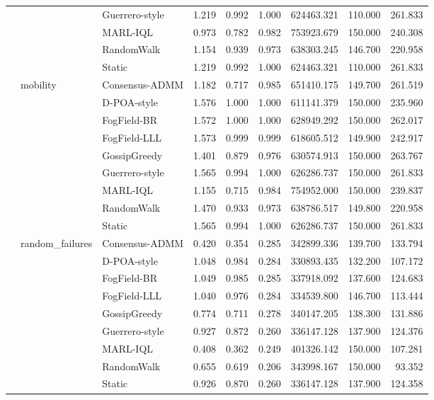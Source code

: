 \begin{table}
\begin{tabular}{lllrrrrrr}
 &  & Guerrero-style & 1.219 & 0.992 & 1.000 & 624463.321 & 110.000 & 261.833 \\
 &  & MARL-IQL & 0.973 & 0.782 & 0.982 & 753923.679 & 150.000 & 240.308 \\
 &  & RandomWalk & 1.154 & 0.939 & 0.973 & 638303.245 & 146.700 & 220.958 \\
 &  & Static & 1.219 & 0.992 & 1.000 & 624463.321 & 110.000 & 261.833 \\
\cline{2-9}
 & \multirow[t]{9}{*}{mobility} & Consensus-ADMM & 1.182 & 0.717 & 0.985 & 651410.175 & 149.700 & 261.519 \\
 &  & D-POA-style & 1.576 & 1.000 & 1.000 & 611141.379 & 150.000 & 235.960 \\
 &  & FogField-BR & 1.572 & 1.000 & 1.000 & 628949.292 & 150.000 & 262.017 \\
 &  & FogField-LLL & 1.573 & 0.999 & 0.999 & 618605.512 & 149.900 & 242.917 \\
 &  & GossipGreedy & 1.401 & 0.879 & 0.976 & 630574.913 & 150.000 & 263.767 \\
 &  & Guerrero-style & 1.565 & 0.994 & 1.000 & 626286.737 & 150.000 & 261.833 \\
 &  & MARL-IQL & 1.155 & 0.715 & 0.984 & 754952.000 & 150.000 & 239.837 \\
 &  & RandomWalk & 1.470 & 0.933 & 0.973 & 638786.517 & 149.800 & 220.958 \\
 &  & Static & 1.565 & 0.994 & 1.000 & 626286.737 & 150.000 & 261.833 \\
\cline{2-9}
 & \multirow[t]{9}{*}{random\_failures} & Consensus-ADMM & 0.420 & 0.354 & 0.285 & 342899.336 & 139.700 & 133.794 \\
 &  & D-POA-style & 1.048 & 0.984 & 0.284 & 330893.435 & 132.200 & 107.172 \\
 &  & FogField-BR & 1.049 & 0.985 & 0.285 & 337918.092 & 137.600 & 124.683 \\
 &  & FogField-LLL & 1.040 & 0.976 & 0.284 & 334539.800 & 146.700 & 113.444 \\
 &  & GossipGreedy & 0.774 & 0.711 & 0.278 & 340147.205 & 138.300 & 131.886 \\
 &  & Guerrero-style & 0.927 & 0.872 & 0.260 & 336147.128 & 137.900 & 124.376 \\
 &  & MARL-IQL & 0.408 & 0.362 & 0.249 & 401326.142 & 150.000 & 107.281 \\
 &  & RandomWalk & 0.655 & 0.619 & 0.206 & 343998.167 & 150.000 & 93.352 \\
 &  & Static & 0.926 & 0.870 & 0.260 & 336147.128 & 137.900 & 124.358 \\

\end{tabular}
\end{table}
